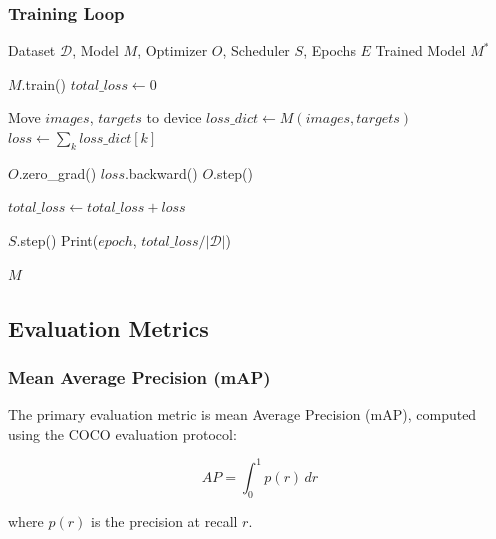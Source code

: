 \documentclass[12pt,a4paper]{article}
\begin{document}
\subsubsection{Training Loop}

\begin{algorithm}[H]
    \caption{Training Loop for Faster R-CNN}
    \label{alg:training}
    \begin{algorithmic}[1]
        \Require Dataset $\mathcal{D}$, Model $M$, Optimizer $O$, Scheduler $S$, Epochs $E$
        \Ensure Trained Model $M^*$
        
            \State $M$.train() 
            \State $total\_loss \gets 0$
            
                \State Move $images$, $targets$ to device
                \State $loss\_dict \gets M(images, targets)$
                \State $loss \gets \sum_{k} loss\_dict[k]$
                
                \State $O$.zero\_grad()
                \State $loss$.backward()
                \State $O$.step()
                
                \State $total\_loss \gets total\_loss + loss$
            \EndFor
            
            \State $S$.step() 
            \State Print($epoch$, $total\_loss / |\mathcal{D}|$)
        \EndFor
        
        \State \Return $M$
    \end{algorithmic}
\end{algorithm}

\subsection{Evaluation Metrics}

\subsubsection{Mean Average Precision (mAP)}

The primary evaluation metric is mean Average Precision (mAP), computed using the COCO evaluation protocol:

\begin{equation}
    AP = \int_0^1 p(r) \, dr
\end{equation}

where $p(r)$ is the precision at recall $r$.
\end{document}
